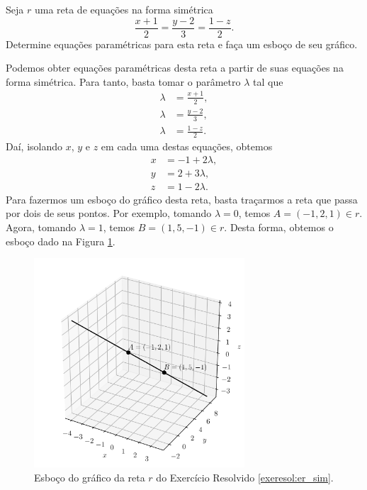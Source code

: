 \begin{exeresol}\label{exeresol:er_sim}
  Seja $r$ uma reta de equações na forma simétrica
  \begin{equation}
    \frac{x+1}{2} = \frac{y-2}{3} = \frac{1-z}{2}.
  \end{equation}
  Determine equações paramétricas para esta reta e faça um esboço de seu gráfico.
\end{exeresol}
\begin{resol}
  Podemos obter equações paramétricas desta reta a partir de suas equações na forma simétrica. Para tanto, basta tomar o parâmetro $\lambda$ tal que
  \begin{align}
    \lambda &= \frac{x+1}{2},\\
    \lambda &= \frac{y-2}{3},\\
    \lambda &= \frac{1-z}{2}.
  \end{align}
  Daí, isolando $x$, $y$ e $z$ em cada uma destas equações, obtemos
  \begin{align}
    x &= -1 + 2\lambda,\\
    y &= 2 + 3\lambda,\\
    z &= 1 - 2\lambda.
  \end{align}
  Para fazermos um esboço do gráfico desta reta, basta traçarmos a reta que passa por dois de seus pontos. Por exemplo, tomando $\lambda = 0$, temos $A = (-1,2,1)\in r$. Agora, tomando $\lambda = 1$, temos $B = (1,5,-1)\in r$. Desta forma, obtemos o esboço dado na Figura \ref{fig:exeresol_er_sim}.

  \begin{figure}[H]
    \centering
    \includegraphics[width=0.7\textwidth]{./cap_estudo/dados/fig_exeresol_er_sim/fig_exeresol_er_sim}
    \caption{Esboço do gráfico da reta $r$ do Exercício Resolvido \ref{exeresol:er_sim}.}
    \label{fig:exeresol_er_sim}
  \end{figure}
\end{resol}

